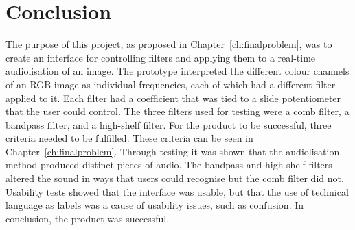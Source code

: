\chapter{Conclusion}\label{ch:conclusion}
The purpose of this project, as proposed in Chapter~\ref{ch:finalproblem}, was to create an interface for controlling filters and applying them to a real-time audiolisation of an image. The prototype interpreted the different colour channels of an RGB image as individual frequencies, each of which had a different filter applied to it. Each filter had a coefficient that was tied to a slide potentiometer that the user could control. The three filters used for testing were a comb filter, a bandpass filter, and a high-shelf filter. For the product to be successful, three criteria needed to be fulfilled. These criteria can be seen in Chapter~\ref{ch:finalproblem}. Through testing it was shown that the audiolisation method produced distinct pieces of audio. The bandpass and high-shelf filters altered the sound in ways that users could recognise but the comb filter did not. Usability tests showed that the interface was usable, but that the use of technical language as labels was a cause of usability issues, such as confusion. In conclusion, the product was successful.
